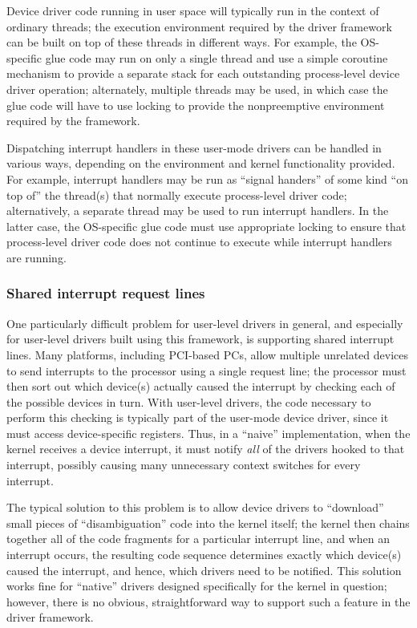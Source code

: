 Device driver code running in user space
will typically run in the context of ordinary threads;
the execution environment required by the driver framework
can be built on top of these threads in different ways.
For example, the OS-specific glue code may run on only a single thread
and use a simple coroutine mechanism
to provide a separate stack
for each outstanding process-level device driver operation;
alternately, multiple threads may be used,
in which case the glue code will have to use locking
to provide the nonpreemptive environment required by the framework.

Dispatching interrupt handlers in these user-mode drivers
can be handled in various ways,
depending on the environment and kernel functionality provided.
For example, interrupt handlers may be run as ``signal handers''
of some kind ``on top of'' the thread(s)
that normally execute process-level driver code;
alternatively, a separate thread may be used to run interrupt handlers.
In the latter case,
the OS-specific glue code must use appropriate locking to ensure
that process-level driver code does not continue to execute
while interrupt handlers are running.


\subsubsection{Shared interrupt request lines}

One particularly difficult problem for user-level drivers in general,
and especially for user-level drivers built using this framework,
is supporting shared interrupt lines.
Many platforms, including PCI-based PCs,
allow multiple unrelated devices
to send interrupts to the processor using a single request line;
the processor must then sort out which device(s) actually caused the interrupt
by checking each of the possible devices in turn.
With user-level drivers, 
the code necessary to perform this checking
is typically part of the user-mode device driver,
since it must access device-specific registers.
Thus, in a ``naive'' implementation,
when the kernel receives a device interrupt,
it must notify \emph{all} of the drivers hooked to that interrupt,
possibly causing many unnecessary context switches for every interrupt.

The typical solution to this problem
is to allow device drivers to ``download'' small pieces
of ``disambiguation'' code into the kernel itself;
the kernel then chains together all of the code fragments
for a particular interrupt line,
and when an interrupt occurs,
the resulting code sequence determines
exactly which device(s) caused the interrupt,
and hence, which drivers need to be notified.
This solution works fine for ``native'' drivers
designed specifically for the kernel in question;
however, there is no obvious, straightforward way
to support such a feature in the driver framework.

